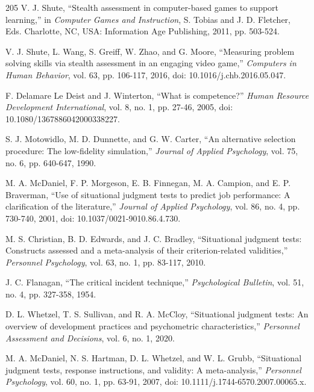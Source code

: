 \begin{thebibliography}{205}
 V. J. Shute, ``Stealth assessment in computer-\allowbreak{}based games to support learning,'' in \textit{Computer Games and Instruction}, S. Tobias and J. D. Fletcher, Eds. Charlotte, NC, USA: Information Age Publishing, 2011, pp. 503-524.

 V. J. Shute, L. Wang, S. Greiff, W. Zhao, and G. Moore, ``Measuring problem solving skills via stealth assessment in an engaging video game,'' \textit{Computers in Human Behavior}, vol. 63, pp. 106-117, 2016, doi: 10.\allowbreak{}1016/\allowbreak{}j.\allowbreak{}chb.\allowbreak{}2016.\allowbreak{}05.\allowbreak{}047.

 F. Delamare Le Deist and J. Winterton, ``What is competence?'' \textit{Human Resource Development International}, vol. 8, no. 1, pp. 27-46, 2005, doi: 10.\allowbreak{}1080/\allowbreak{}1367886042000338227.

 S. J. Motowidlo, M. D. Dunnette, and G. W. Carter, ``An alternative selection procedure: The low-\allowbreak{}fidelity simulation,'' \textit{Journal of Applied Psychology}, vol. 75, no. 6, pp. 640-647, 1990.

 M. A. McDaniel, F. P. Morgeson, E. B. Finnegan, M. A. Campion, and E. P. Braverman, ``Use of situational judgment tests to predict job performance: A clarification of the literature,'' \textit{Journal of Applied Psychology}, vol. 86, no. 4, pp. 730-740, 2001, doi: 10.\allowbreak{}1037/\allowbreak{}0021-\allowbreak{}9010.\allowbreak{}86.\allowbreak{}4.\allowbreak{}730.

 M. S. Christian, B. D. Edwards, and J. C. Bradley, ``Situational judgment tests: Constructs assessed and a meta-\allowbreak{}analysis of their criterion-\allowbreak{}related validities,'' \textit{Personnel Psychology}, vol. 63, no. 1, pp. 83-117, 2010.

 J. C. Flanagan, ``The critical incident technique,'' \textit{Psychological Bulletin}, vol. 51, no. 4, pp. 327-358, 1954.

 D. L. Whetzel, T. S. Sullivan, and R. A. McCloy, ``Situational judgment tests: An overview of development practices and psychometric characteristics,'' \textit{Personnel Assessment and Decisions}, vol. 6, no. 1, 2020.

 M. A. McDaniel, N. S. Hartman, D. L. Whetzel, and W. L. Grubb, ``Situational judgment tests, response instructions, and validity: A meta-\allowbreak{}analysis,'' \textit{Personnel Psychology}, vol. 60, no. 1, pp. 63-91, 2007, doi: 10.\allowbreak{}1111/\allowbreak{}j.\allowbreak{}1744-\allowbreak{}6570.\allowbreak{}2007.\allowbreak{}00065.\allowbreak{}x.


\end{thebibliography}

